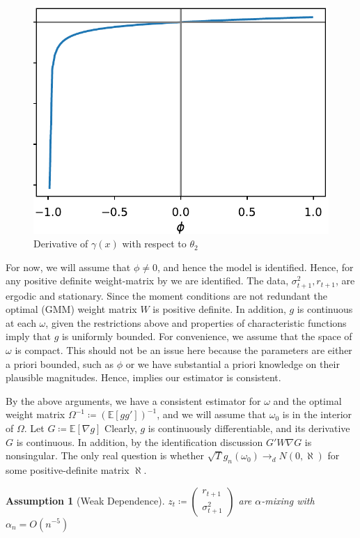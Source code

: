 \documentclass[11pt]{article}
\newtheorem{Assumption}{Assumption}[section]
\newcommand*{\E}{\mathbb{E}}
\newcommand*{\N}{N}
\newcommand*{\dto}{\ensuremath{\rightarrow_d}}
\begin{document}
\begin{figure}[htb]
    \centering
    \caption{Derivative of $\gamma(x)$ with respect to $\theta_2$}
    \label{fig:fig:gamma_diff_theta2}
    \includegraphics[width=.5\textwidth]{gamma_diff_theta2.pdf}
\end{figure}


For now, we will assume that $\phi \neq 0$, and hence the model is identified.
Hence, for any positive definite weight-matrix by \textcite[Lemma 2.3]{newey1994large} we are identified.
The data, $\sigma^2_{t+1}, r_{t+1}$, are ergodic and stationary.
Since the moment conditions are not redundant the optimal (GMM) weight matrix $W$ is positive definite. 
In addition, $g$ is continuous at each $\omega$, given the restrictions above and properties of characteristic
functions imply that $g$ is uniformly bounded. 
For convenience, we assume that the space of $\omega$ is compact.
This should not be an issue here because the parameters  are either a priori bounded, such as $\phi$ or we have
substantial a priori knowledge on their plausible magnitudes.
Hence, \textcite[Theroem 2.6]{newey1994large} implies our estimator is consistent.

By the above arguments, we have a consistent estimator for $\omega$ and the optimal weight matrix $\Omega^{-1}
\coloneqq (\E\left[g g'\right])^{-1}$, and we will assume that $\omega_0$ is in the interior of $\Omega$.
Let $G \coloneqq \E\left[\nabla g\right]$
Clearly, $g$ is continuously differentiable, and its derivative $G$ is continuous.
In addition, by the identification discussion $G' W \nabla G$ is nonsingular.
The only real question is whether $\sqrt{T} g_n(\omega_0) \dto \N(0, \aleph)$ for some positive-definite matrix
$\aleph$.

\begin{Assumption}[Weak Dependence]
    \label{assumption:weak_dependence}
    $z_t \coloneqq \begin{pmatrix} r_{t+1} \\ \sigma^2_{t+1} \end{pmatrix}$ are $\alpha$-mixing with $\alpha_n =
       O\left(n^{-5}\right)$
\end{Assumption}
\end{document}
